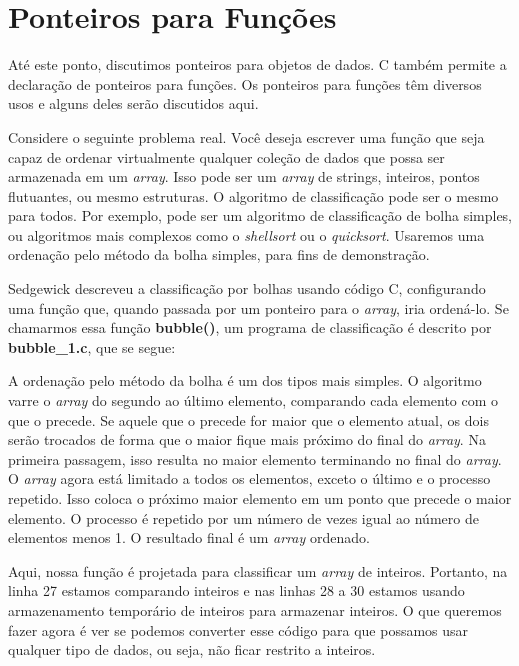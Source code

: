
\chapter{Ponteiros para Funções}
Até este ponto, discutimos ponteiros para objetos de dados. C também permite a declaração de ponteiros para funções. Os ponteiros para funções têm diversos usos e alguns deles serão discutidos aqui.

Considere o seguinte problema real. Você deseja escrever uma função que seja capaz de ordenar virtualmente qualquer coleção de dados que possa ser armazenada em um \textit{array}. Isso pode ser um \textit{array} de strings, inteiros, pontos flutuantes, ou mesmo estruturas. O algoritmo de classificação pode ser o mesmo para todos. Por exemplo, pode ser um algoritmo de classificação de bolha simples, ou algoritmos mais complexos como o \textit{shellsort} ou o \textit{quicksort}. Usaremos uma ordenação pelo método da bolha simples, para fins de demonstração.

Sedgewick \cite{sedgewick} descreveu a classificação por bolhas usando código C, configurando uma função que, quando passada por um ponteiro para o \textit{array}, iria ordená-lo. Se chamarmos essa função \textbf{bubble()}, um programa de classificação é descrito por \textbf{bubble\_1.c}, que se segue:


A ordenação pelo método da bolha é um dos tipos mais simples. O algoritmo varre o \textit{array} do segundo ao último elemento, comparando cada elemento com o que o precede. Se aquele que o precede for maior que o elemento atual, os dois serão trocados de forma que o maior fique mais próximo do final do \textit{array}. Na primeira passagem, isso resulta no maior elemento terminando no final do \textit{array}. O \textit{array} agora está limitado a todos os elementos, exceto o último e o processo repetido. Isso coloca o próximo maior elemento em um ponto que precede o maior elemento. O processo é repetido por um número de vezes igual ao número de elementos menos 1. O resultado final é um \textit{array} ordenado.

Aqui, nossa função é projetada para classificar um \textit{array} de inteiros. Portanto, na linha 27 estamos comparando inteiros e nas linhas 28 a 30 estamos usando armazenamento temporário de inteiros para armazenar inteiros. O que queremos fazer agora é ver se podemos converter esse código para que possamos usar qualquer tipo de dados, ou seja, não ficar restrito a inteiros.

